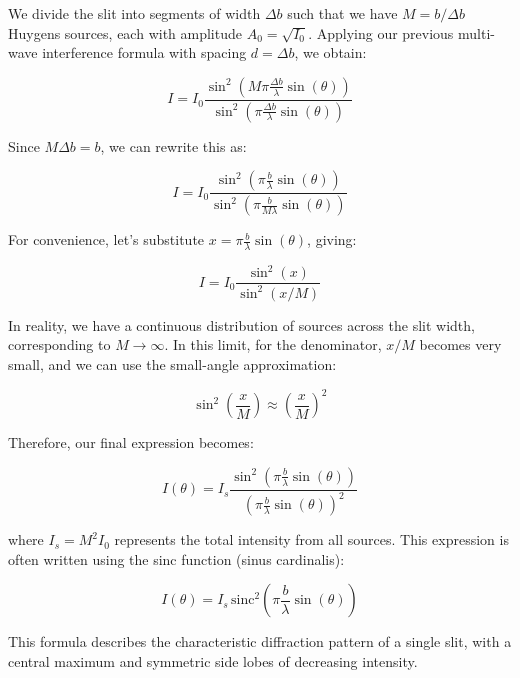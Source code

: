 \documentclass[
  a4paper,
]{book}
\begin{document}
We divide the slit into segments of width \(\Delta b\) such that we have
\(M=b/\Delta b\) Huygens sources, each with amplitude
\(A_0=\sqrt{I_0}\). Applying our previous multi-wave interference
formula with spacing \(d=\Delta b\), we obtain:

\[
I=I_0 \frac{\sin^2\left (M\pi\frac{\Delta b}{\lambda}\sin(\theta)\right)}{\sin^2\left (\pi\frac{\Delta b}{\lambda}\sin(\theta)\right)}
\]

Since \(M\Delta b = b\), we can rewrite this as:

\[
I=I_0 \frac{\sin^2\left (\pi\frac{b}{\lambda}\sin(\theta)\right)}{\sin^2\left (\pi\frac{b}{M\lambda}\sin(\theta)\right)}
\]

For convenience, let's substitute
\(x=\pi \frac{b}{\lambda}\sin(\theta)\), giving:

\[
I=I_0\frac{\sin^2(x)}{\sin^2(x/M)}
\]

In reality, we have a continuous distribution of sources across the slit
width, corresponding to \(M\to\infty\). In this limit, for the
denominator, \(x/M\) becomes very small, and we can use the small-angle
approximation:

\[
\sin^2\left (\frac{x}{M}\right) \approx \left(\frac{x}{M}\right)^2
\]

Therefore, our final expression becomes:

\[
I(\theta)=I_s\frac{\sin^2\left (\pi \frac{b}{\lambda}\sin(\theta)\right)}{\left(\pi \frac{b}{\lambda}\sin(\theta)\right)^2}
\]

where \(I_s=M^2I_0\) represents the total intensity from all sources.
This expression is often written using the sinc function (sinus
cardinalis):

\[
I(\theta)=I_s\,\text{sinc}^2\left(\pi \frac{b}{\lambda}\sin(\theta)\right)
\]

This formula describes the characteristic diffraction pattern of a
single slit, with a central maximum and symmetric side lobes of
decreasing intensity.
\end{document}
